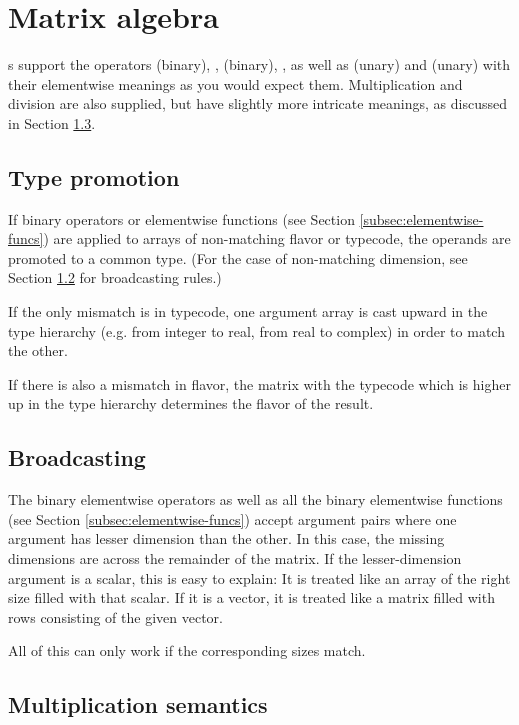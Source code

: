 \section{Matrix algebra}
s support the operators \code{+} (binary), \code{+=},
\code{-} (binary), \code{-=}, as well as \code{+} (unary) and \code{-}
(unary) with their elementwise meanings as you would expect them.
Multiplication and division are also supplied, but have slightly more
intricate meanings, as discussed in Section
\ref{subsec:arraymultiplication}.

\subsection{Type promotion}
\label{subsec:arraypromotion}

If binary operators or elementwise functions (see Section
\ref{subsec:elementwise-funcs}) are applied to arrays of non-matching flavor or
typecode, the operands are promoted to a common type. (For the case of
non-matching dimension, see Section \ref{subsec:arraybroadcast} for
broadcasting rules.)

If the only mismatch is in typecode, one argument array
is cast upward in the type hierarchy (e.g. from integer to real,
from real to complex) in order to match the other.

If there is also a mismatch in flavor, the matrix with the typecode
which is higher up in the type hierarchy determines the flavor of the
result.

\subsection{Broadcasting}
\label{subsec:arraybroadcast}

The binary elementwise operators as well as all the binary elementwise
functions (see Section \ref{subsec:elementwise-funcs}) accept argument pairs
where one argument has lesser dimension than the other. In this case, the
missing dimensions are  across the remainder
of the matrix. If the lesser-dimension argument is a scalar, this is easy to
explain: It is treated like an array of the right size filled with that scalar.
If it is a vector, it is treated like a matrix filled with rows consisting of
the given vector.

All of this can only work if the corresponding  sizes 
match.


\subsection{Multiplication semantics}
\label{subsec:arraymultiplication}


